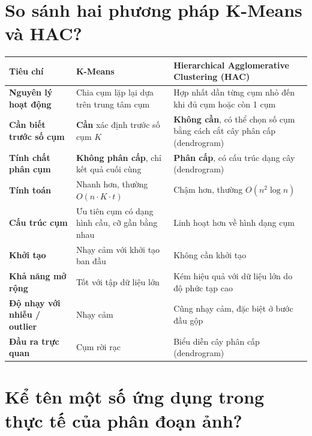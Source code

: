 \documentclass[12pt]{article}
\begin{document}
	\section{So sánh hai phương pháp K-Means và HAC?}
	
	\begin{longtable}{|>{\raggedright\arraybackslash}p{4cm}|>{\raggedright\arraybackslash}p{5.5cm}|>{\raggedright\arraybackslash}p{5.5cm}|}
	\hline
	\textbf{Tiêu chí} & \textbf{K-Means} & \textbf{Hierarchical Agglomerative Clustering (HAC)} \\
	\hline
	\textbf{Nguyên lý hoạt động} & Chia cụm lặp lại dựa trên trung tâm cụm & Hợp nhất dần từng cụm nhỏ đến khi đủ cụm hoặc còn 1 cụm \\
	\hline
	\textbf{Cần biết trước số cụm} & \textbf{Cần} xác định trước số cụm $K$ & \textbf{Không cần}, có thể chọn số cụm bằng cách cắt cây phân cấp (dendrogram) \\
	\hline
	\textbf{Tính chất phân cụm} & \textbf{Không phân cấp}, chỉ kết quả cuối cùng & \textbf{Phân cấp}, có cấu trúc dạng cây (dendrogram) \\
	\hline
	\textbf{Tính toán} & Nhanh hơn, thường $O(n \cdot K \cdot t)$ & Chậm hơn, thường $O(n^2 \log n)$ \\
	\hline
	\textbf{Cấu trúc cụm} & Ưu tiên cụm có dạng hình cầu, cỡ gần bằng nhau & Linh hoạt hơn về hình dạng cụm \\
	\hline
	\textbf{Khởi tạo} & Nhạy cảm với khởi tạo ban đầu & Không cần khởi tạo \\
	\hline
	\textbf{Khả năng mở rộng} & Tốt với tập dữ liệu lớn & Kém hiệu quả với dữ liệu lớn do độ phức tạp cao \\
	\hline
	\textbf{Độ nhạy với nhiễu / outlier} & Nhạy cảm & Cũng nhạy cảm, đặc biệt ở bước đầu gộp \\
	\hline
	\textbf{Đầu ra trực quan} & Cụm rời rạc & Biểu diễn cây phân cấp (dendrogram) \\
	\hline
	\end{longtable}
	
	\section{Kể tên một số ứng dụng trong thực tế của phân đoạn ảnh?}
	
\end{document}
